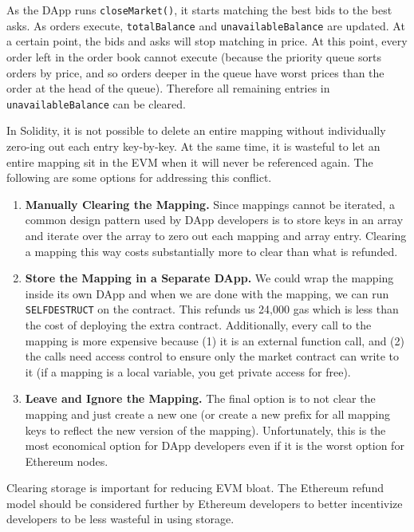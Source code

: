 As the DApp runs \texttt{closeMarket()}, it starts matching the best bids to the best asks. As orders execute, \texttt{totalBalance} and \texttt{unavailableBalance} are updated. At a certain point, the bids and asks will stop matching in price. At this point, every order left in the order book cannot execute (because the priority queue sorts orders by price, and so orders deeper in the queue have worst prices than the order at the head of the queue). Therefore all remaining entries in \texttt{unavailableBalance} can be cleared.

In Solidity, it is not possible to delete an entire mapping without individually zero-ing out each entry key-by-key. At the same time, it is wasteful to let an entire mapping sit in the EVM when it will never be referenced again. The following are some options for addressing this conflict.

\begin{enumerate}

\item \textbf{Manually Clearing the Mapping.} Since mappings cannot be iterated, a common design pattern used by DApp developers is to store keys in an array and iterate over the array to zero out each mapping and array entry. Clearing a mapping this way costs substantially more to clear than what is refunded.

\item \textbf{Store the Mapping in a Separate DApp.} We could wrap the mapping inside its own DApp and when we are done with the mapping, we can run \texttt{SELFDESTRUCT} on the contract. This refunds us 24,000 gas which is less than the cost of deploying the extra contract. Additionally, every call to the mapping is more expensive because (1) it is an external function call, and (2) the calls need access control to ensure only the market contract can write to it (if a mapping is a local variable, you get private access for free). 

\item \textbf{Leave and Ignore the Mapping.} The final option is to not clear the mapping and just create a new one (or create a new prefix for all mapping keys to reflect the new version of the mapping). Unfortunately, this is the most economical option for DApp developers even if it is the worst option for Ethereum nodes. 

\end{enumerate}

Clearing storage is important for reducing EVM bloat. The Ethereum refund model should be considered further by Ethereum developers to better incentivize developers to be less wasteful in using storage. 


